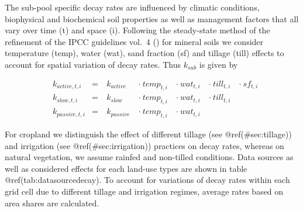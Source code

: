 \documentclass[gc, manuscript]{copernicus}
\begin{document}
The sub-pool specific decay rates are influenced by climatic conditions,
biophysical and biochemical soil properties as well as management
factors that all vary over time (t) and space (i). Following the
steady-state method of the refinement of the IPCC guidelines vol.~4
(\citet{ipcc_2019_2019}) for mineral soils we consider temperature
(temp), water (wat), sand fraction (sf) and tillage (till) effects to
account for spatial variation of decay rates. Thus \(k_{sub}\) is given
by

\begin{equation}
\begin{aligned}
& k_{active,t,i}  & = &~ k_{active}  ~ &\cdot~ temp_{t,i} ~ &\cdot~ wat_{t,i} ~ &\cdot~ till_{t,i} ~ & \cdot~ sf_{t,i}\\
& k_{slow,t,i}    & = &~ k_{slow}    ~ &\cdot~ temp_{t,i} ~ &\cdot~ wat_{t,i} ~ &\cdot~ till_{t,i} ~ &\\
& k_{passive,t,i} & = &~ k_{passive} ~ &\cdot~ temp_{t,i} ~ &\cdot~ wat_{t,i} ~ & ~ &
\label{eq:decayrates}
\end{aligned}
\end{equation}

For cropland we distinguish the effect of different tillage (see
@ref(\#sec:tillage)) and irrigation (see @ref(\#sec:irrigation))
practices on decay rates, whereas on natural vegetation, we assume
rainfed and non-tilled conditions. Data sources as well as considered
effects for each land-use types are shown in table
@ref(tab:datasourcedecay). To account for variations of decay rates
within each grid cell due to different tillage and irrigation regimes,
average rates based on area shares are calculated.
\end{document}
